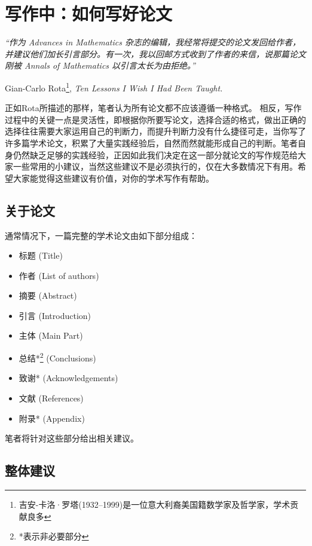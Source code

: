 \documentclass{formatBook}
\begin{document}
\section{写作中：如何写好论文}
\noindent \textit{“作为 Advances in Mathematics 杂志的编辑，我经常将提交的论文发回给作者，并建议他们加长引言部分。有一次，我以回邮方式收到了作者的来信，说那篇论文刚被 Annals of Mathematics 以引言太长为由拒绝。”}
\begin{flushright}
    \cndash Gian-Carlo Rota\footnote{吉安-卡洛·罗塔(1932–1999)是一位意大利裔美国籍数学家及哲学家，学术贡献良多}, \textit{Ten Lessons I Wish I Had Been Taught.}
\end{flushright}
正如Rota所描述的那样，笔者认为所有论文都不应该遵循一种格式。 相反，写作过程中的关键一点是灵活性，即根据你所要写论文，选择合适的格式，做出正确的选择往往需要大家运用自己的判断力，而提升判断力没有什么捷径可走，当你写了许多篇学术论文，积累了大量实践经验后，自然而然就能形成自己的判断。笔者自身仍然缺乏足够的实践经验，正因如此我们决定在这一部分就论文的写作规范给大家一些常用的小建议，当然这些建议不是必须执行的，仅在大多数情况下有用。希望大家能觉得这些建议有价值，对你的学术写作有帮助。
\subsection{关于论文}
通常情况下，一篇完整的学术论文由如下部分组成：
\begin{itemize}
    \item 标题 (Title)
    \item 作者 (List of authors)
    \item 摘要 (Abstract)
    \item 引言 (Introduction)
    \item 主体 (Main Part)
    \item 总结*\footnote{*表示非必要部分} (Conclusions)
    \item 致谢* (Acknowledgements)
    \item 文献 (References)
    \item 附录* (Appendix)
\end{itemize}
\par
笔者将针对这些部分给出相关建议。
\subsection{整体建议}
\end{document}
